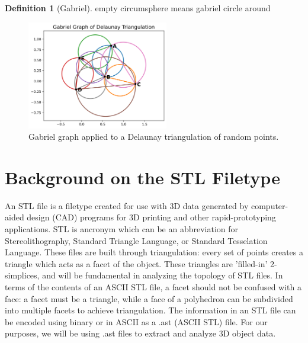 \documentclass[ma]{uncgdissertationexp}
\theoremstyle{plain}
\theoremstyle{definition}
\newtheorem{definition}[theorem]{Definition}
\theoremstyle{remark}
\begin{document}
\begin{definition}[Gabriel]
empty circumsphere means gabriel \cite{gabriel} circle around 
\end{definition}

\begin{figure}[H]
    \begin{center}
    \includegraphics[width=0.55\textwidth]{gabriel_circles.png}
    \caption{Gabriel graph applied to a Delaunay triangulation of random points.}
    \label{fig:ast_tetrahedron}
    \end{center}
\end{figure}

\newpage
\section{Background on the STL Filetype}
An STL file is a filetype created for use with 3D data generated by computer-aided design (CAD) programs for 3D printing and other rapid-prototyping applications. STL is ancronym which can be an abbreviation for Stereolithography, Standard Triangle Language, or Standard Tesselation Language. These files are built through triangulation: every set of points creates a triangle which acts as a facet of the object. These triangles are 'filled-in' 2-simplices, and will be fundamental in analyzing the topology of STL files. In terms of the contents of an ASCII STL file, a facet should not be confused with a face: a facet must be a triangle, while a face of a polyhedron can be subdivided into multiple facets to achieve triangulation. The information in an STL file can be encoded using binary or in ASCII as a .ast (ASCII STL) file. For our purposes, we will be using .ast files to extract and analyze 3D object data. \cite{analysis_of_stl}
\end{document}
